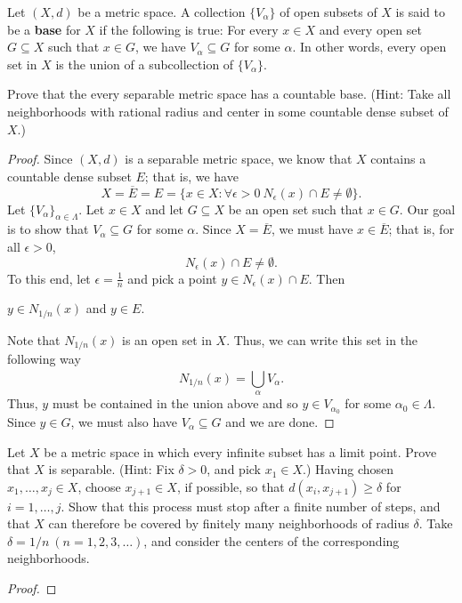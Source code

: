 \documentclass[a4paper]{article}
\begin{document}
   \begin{problem}
       Let \( (X,d) \) be a metric space. A collection \( \{ {V}_{\alpha} \} \) of open subsets of \( X  \) is said to be a \textbf{base} for \( X  \) if the following is true: For every \( x \in X  \) and every open set \( G \subseteq X   \) such that \( x \in G  \), we have \( {V}_{\alpha} \subseteq G   \) for some \( \alpha \). In other words, every open set in \( X  \) is the union of a subcollection of \( \{ {V}_{\alpha} \}  \). 

       Prove that the every separable metric space has a countable base. (Hint: Take all neighborhoods with rational radius and center in some countable dense subset of \( X  \).)
   \end{problem}
   \begin{proof}
   Since \( (X,d) \) is a separable metric space, we know that \( X  \) contains a countable dense subset \( E  \); that is, we have 
   \[  X = \overline{E} = E = \{ x \in X : \forall \epsilon > 0 \ {N}_{\epsilon}(x) \cap E \neq \emptyset \}. \]
   Let \( \{ {V}_{\alpha} \}_{\alpha \in \Lambda} \). Let \( x \in X  \) and let \( G \subseteq  X   \) be an open set such that \( x \in G  \). Our goal is to show that \( {V}_{\alpha} \subseteq  G  \) for some \( \alpha \). Since \( X = \overline{E } \), we must have \( x \in \overline{E} \); that is, for all \( \epsilon > 0  \),
   \[  {N}_{\epsilon}(x) \cap E \neq \emptyset. \]
   To this end, let \( \epsilon = \frac{ 1 }{ n }  \) and pick a point \( y \in {N}_{\epsilon}(x) \cap E  \). Then
   \begin{center}
       \( y \in {N}_{1/n}(x) \) and \( y \in E  \).
   \end{center}
    Note that \( {N}_{1/n}(x) \) is an open set in \( X  \). Thus, we can write this set in the following way
    \[  {N}_{1/n}(x) = \bigcup_{ \alpha }^{  } {V}_{\alpha}. \]
    Thus, \( y  \) must be contained in the union above and so \( y \in {V}_{\alpha_0} \) for some \( {\alpha}_{0} \in \Lambda \). Since \( y \in G  \), we must also have \( {V}_{\alpha} \subseteq G  \) and we are done.
   \end{proof}

   \begin{problem}
      Let \( X  \) be a metric space in which every infinite subset has a limit point. Prove that \( X  \) is separable. (Hint: Fix \( \delta > 0  \), and pick \( {x}_{1} \in X  \).) Having chosen \( {x}_{1}, \dots, {x}_{j} \in X  \), choose \( {x}_{j+1} \in X  \), if possible, so that \( d({x}_{i}, {x}_{j+1}) \geq \delta \) for \( i = 1,\dots, j \). Show that this process must stop after a finite number of steps, and that \( X  \) can therefore be covered by finitely many neighborhoods of radius \( \delta  \). Take \( \delta = 1/n \ (n = 1,2,3,\dots) \), and consider the centers of the corresponding neighborhoods.
   \end{problem}
   \begin{proof}
   
   \end{proof}
\end{document}
